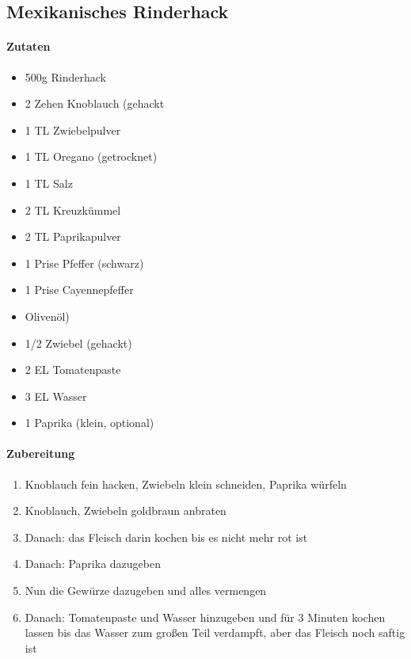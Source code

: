 \newpage
\subsection{Mexikanisches Rinderhack}
\paragraph{Zutaten}
\begin{itemize}[noitemsep]
	\item 500g Rinderhack
	\item 2 Zehen Knoblauch (gehackt
	\item 1 TL Zwiebelpulver
	\item 1 TL Oregano (getrocknet)
	\item 1 TL Salz
	\item 2 TL Kreuzkümmel
	\item 2 TL Paprikapulver
	\item 1 Prise Pfeffer (schwarz)
	\item 1 Prise Cayennepfeffer
	\item Olivenöl)
	\item 1/2 Zwiebel (gehackt)
	\item 2 EL Tomatenpaste
	\item 3 EL Wasser
	\item 1 Paprika (klein, optional)
\end{itemize}
\paragraph{Zubereitung}
\begin{enumerate}[noitemsep]
	\item Knoblauch fein hacken, Zwiebeln klein schneiden, Paprika würfeln
	\item Knoblauch, Zwiebeln goldbraun anbraten
	\item Danach: das Fleisch darin kochen bis es nicht mehr rot ist 
	\item Danach: Paprika dazugeben
	\item Nun die Gewürze dazugeben und alles vermengen
	\item Danach: Tomatenpaste und Wasser hinzugeben und für 3 Minuten kochen lassen bis das Wasser zum großen Teil verdampft, aber das Fleisch noch saftig ist
\end{enumerate}

